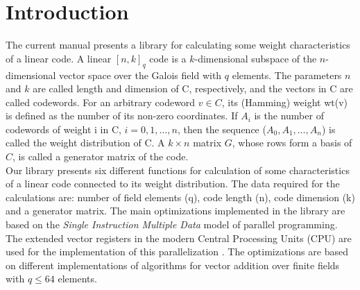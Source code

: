 \section{Introduction}
	 The current manual presents a library for calculating some weight characteristics of a linear code. A linear $[n,k]_q$ code is a $k$-dimensional subspace of the $n$-dimensional vector space over the Galois field with $q$ elements. The parameters $n$ and $k$ are called length and dimension of C, respectively, and the vectors in C are called codewords. For an arbitrary codeword $v \in C$, its (Hamming) weight wt(v) is defined as the number of its non-zero coordinates. If $A_i$ is the number of codewords of weight i in C, $i = 0, 1, \dots, n$, then
	 the sequence ($A_0, A_1, \dots, A_n$) is called the weight distribution of C. A $k \times n$ matrix $G$, whose rows form a basis of $C$, is called a generator matrix of the code. \\
	 Our library presents six different functions for calculation of some  characteristics of a linear code connected to its weight distribution. The data required for the calculations are: number of field elements (q), code length (n), code dimension (k) and a generator matrix. The main optimizations implemented in the library are based on the \emph{Single Instruction Multiple Data} model of parallel programming. The extended vector registers in the modern Central Processing Units (CPU) are used for the implementation of this parallelization \cite{intel, arm}. 
	 The optimizations are based on different implementations of algorithms for vector addition over finite fields with $q \leq 64$ elements. 
	 

